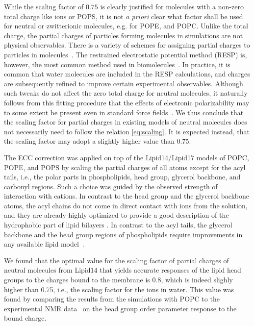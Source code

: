 While the scaling factor of $0.75$ is clearly justified for molecules with a non-zero total charge like ions or POPS,
it is not \emph{a priori} clear what factor shall be used for neutral or zwitterionic molecules, e.g. for POPE, and POPC. 
Unlike the total charge, the partial charges of particles forming molecules in simulations are not physical observables. 
There is a variety of schemes for assigning partial charges to particles in molecules~\citep{Hu2007}. 
The restrained electrostatic potential method (RESP) is, however, the most common method used in biomolecules~\citep{RESP_paper, Singh1984, dickson14}. 
In practice, it is common that water molecules are included in the RESP calculations, 
and charges are subsequently refined to improve certain experimental observables. 
Although such tweaks do not affect the zero total charge for neutral molecules,
it naturally follows from this fitting procedure that the effects of electronic polarizability 
may to some extent be present even in standard force fields~\citep{RESP_paper, Singh1984, jorgensen96, ipolq2013, benavides17}. 
We thus conclude that the scaling factor for partial charges in existing models of neutral molecules does not necessarily need to follow the relation \ref{eq:scaling}.
It is expected instead, that the scaling factor may adopt a slightly higher value than 0.75. 

The ECC correction was applied on top of the Lipid14/Lipid17 models of POPC, POPE, and POPS
by scaling the partial charges of all atoms except for the acyl tails, 
i.e., the polar parts in phospholipids, head group, glycerol backbone, and carbonyl regions. 
Such a choice was guided by the observed strength of interaction with cations. 
In contrast to the head group and the glycerol backbone atoms, 
the acyl chains do not come in direct contact with ions from the solution, 
and they are already highly optimized to provide a good description of the
hydrophobic part of lipid bilayers \cite{dickson14, ollila16, Pluhackova2016}.
In contrast to the acyl tails, the glycerol backbone and the head group regions of phospholipids 
require improvements in any available lipid model~\cite{botan15}.

We found that the optimal value for the scaling factor of partial charges of neutral molecules from Lipid14 
that yields accurate responses of the lipid head groups to the charges bound to the membrane
is $0.8$, which is indeed slighly higher than 0.75, 
i.e., the scaling factor for the ions in water. 
This value was found by comparing the results from the simulations with POPC to the experimental 
NMR data~\cite{akutsu81,altenbach84,scherer89} on the head group order parameter response to the bound charge.

